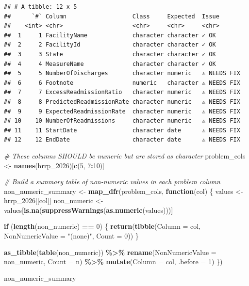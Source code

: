 \documentclass[
]{article}
\newenvironment{Shaded}{\begin{snugshade}}{\end{snugshade}}
\newcommand{\AttributeTok}[1]{\textcolor[rgb]{0.13,0.29,0.53}{#1}}
\newcommand{\CommentTok}[1]{\textcolor[rgb]{0.56,0.35,0.01}{\textit{#1}}}
\newcommand{\ControlFlowTok}[1]{\textcolor[rgb]{0.13,0.29,0.53}{\textbf{#1}}}
\newcommand{\DecValTok}[1]{\textcolor[rgb]{0.00,0.00,0.81}{#1}}
\newcommand{\FunctionTok}[1]{\textcolor[rgb]{0.13,0.29,0.53}{\textbf{#1}}}
\newcommand{\NormalTok}[1]{#1}
\newcommand{\OtherTok}[1]{\textcolor[rgb]{0.56,0.35,0.01}{#1}}
\newcommand{\SpecialCharTok}[1]{\textcolor[rgb]{0.81,0.36,0.00}{\textbf{#1}}}
\newcommand{\StringTok}[1]{\textcolor[rgb]{0.31,0.60,0.02}{#1}}
\begin{document}
\begin{verbatim}
## # A tibble: 12 x 5
##      `#` Column                   Class     Expected  Issue      
##    <int> <chr>                    <chr>     <chr>     <chr>      
##  1     1 FacilityName             character character ✓ OK       
##  2     2 FacilityId               character character ✓ OK       
##  3     3 State                    character character ✓ OK       
##  4     4 MeasureName              character character ✓ OK       
##  5     5 NumberOfDischarges       character numeric   ⚠️ NEEDS FIX
##  6     6 Footnote                 numeric   character ⚠️ NEEDS FIX
##  7     7 ExcessReadmissionRatio   character numeric   ⚠️ NEEDS FIX
##  8     8 PredictedReadmissionRate character numeric   ⚠️ NEEDS FIX
##  9     9 ExpectedReadmissionRate  character numeric   ⚠️ NEEDS FIX
## 10    10 NumberOfReadmissions     character numeric   ⚠️ NEEDS FIX
## 11    11 StartDate                character date      ⚠️ NEEDS FIX
## 12    12 EndDate                  character date      ⚠️ NEEDS FIX
\end{verbatim}

\begin{Shaded}
\begin{Highlighting}[]
\CommentTok{\# These columns SHOULD be numeric but are stored as character}
\NormalTok{problem\_cols }\OtherTok{\textless{}{-}} \FunctionTok{names}\NormalTok{(hrrp\_2026)[}\FunctionTok{c}\NormalTok{(}\DecValTok{5}\NormalTok{, }\DecValTok{7}\SpecialCharTok{:}\DecValTok{10}\NormalTok{)]}

\CommentTok{\# Build a summary table of non{-}numeric values in each problem column}
\NormalTok{non\_numeric\_summary }\OtherTok{\textless{}{-}} \FunctionTok{map\_dfr}\NormalTok{(problem\_cols, }\ControlFlowTok{function}\NormalTok{(col) \{}
\NormalTok{    values }\OtherTok{\textless{}{-}}\NormalTok{ hrrp\_2026[[col]]}
\NormalTok{    non\_numeric }\OtherTok{\textless{}{-}}\NormalTok{ values[}\FunctionTok{is.na}\NormalTok{(}\FunctionTok{suppressWarnings}\NormalTok{(}\FunctionTok{as.numeric}\NormalTok{(values)))]}
    
    \ControlFlowTok{if}\NormalTok{ (}\FunctionTok{length}\NormalTok{(non\_numeric) }\SpecialCharTok{==} \DecValTok{0}\NormalTok{) \{}
        \FunctionTok{return}\NormalTok{(}\FunctionTok{tibble}\NormalTok{(}\AttributeTok{Column =}\NormalTok{ col, }\AttributeTok{NonNumericValue =} \StringTok{"(none)"}\NormalTok{, }\AttributeTok{Count =} \DecValTok{0}\NormalTok{))}
\NormalTok{    \}}
    
    \FunctionTok{as\_tibble}\NormalTok{(}\FunctionTok{table}\NormalTok{(non\_numeric)) }\SpecialCharTok{\%\textgreater{}\%}
        \FunctionTok{rename}\NormalTok{(}\AttributeTok{NonNumericValue =}\NormalTok{ non\_numeric, }\AttributeTok{Count =}\NormalTok{ n) }\SpecialCharTok{\%\textgreater{}\%}
        \FunctionTok{mutate}\NormalTok{(}\AttributeTok{Column =}\NormalTok{ col, }\AttributeTok{.before =} \DecValTok{1}\NormalTok{)}
\NormalTok{\})}

\NormalTok{non\_numeric\_summary}
\end{Highlighting}
\end{Shaded}
\end{document}
